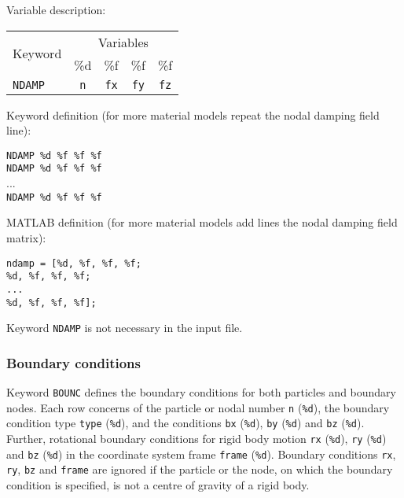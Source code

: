 Variable description:

\begin{tabular}{|l|c|c|c|c|}
\hline
\multirow{2}{*}{Keyword} & \multicolumn{4}{c|}{Variables} \\ \cline{2-5}
& \%d & \%f & \%f & \%f \\ \hline
\texttt{NDAMP} & \texttt{n} & \texttt{fx} & \texttt{fy} & \texttt{fz} \\ \hline
\end{tabular}

Keyword definition (for more material models repeat the nodal damping field line):

\begin{tcolorbox}
\texttt{NDAMP \%d \%f \%f \%f} \\
\texttt{NDAMP \%d \%f \%f \%f} \\
... \\
\texttt{NDAMP \%d \%f \%f \%f} \\
\end{tcolorbox}

MATLAB definition (for more material models add lines the nodal damping field matrix):

\begin{tcolorbox}
\texttt{ndamp = [\%d, \%f, \%f, \%f; \\
\%d, \%f, \%f, \%f; \\
... \\
\%d, \%f, \%f, \%f];}
\end{tcolorbox}

Keyword \texttt{NDAMP} is not necessary in the input file.

\newpage


\subsubsection{Boundary conditions}

Keyword \texttt{BOUNC} defines the boundary conditions for both particles and boundary nodes. Each row concerns of the particle or nodal number \texttt{n} (\texttt{\%d}), the boundary condition type \texttt{type} (\texttt{\%d}), and the conditions \texttt{bx} (\texttt{\%d}), \texttt{by} (\texttt{\%d}) and \texttt{bz} (\texttt{\%d}). Further, rotational boundary conditions for rigid body motion \texttt{rx} (\texttt{\%d}), \texttt{ry} (\texttt{\%d}) and \texttt{bz} (\texttt{\%d}) in the coordinate system frame \texttt{frame} (\texttt{\%d}). Boundary conditions \texttt{rx}, \texttt{ry}, \texttt{bz} and \texttt{frame} are ignored if the particle or the node, on which the boundary condition is specified, is not a centre of gravity of a rigid body.

